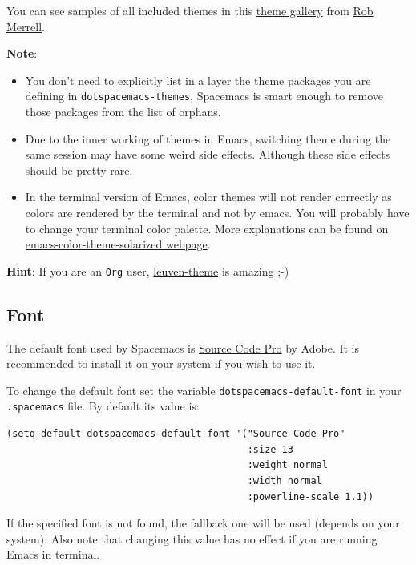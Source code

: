 \documentclass[11pt]{article}
\begin{document}
You can see samples of all included themes in this \href{http://themegallery.robdor.com}{theme gallery} from \href{http://www.twitter.com/robmerrell}{Rob Merrell}.

\textbf{Note}:
\begin{itemize}
\item You don't need to explicitly list in a layer the theme packages you are
defining in \texttt{dotspacemacs-themes}, Spacemacs is smart enough to remove those
packages from the list of orphans.
\item Due to the inner working of themes in Emacs, switching theme during the same
session may have some weird side effects. Although these side effects should
be pretty rare.
\item In the terminal version of Emacs, color themes will not render correctly as
colors are rendered by the terminal and not by emacs. You will probably have
to change your terminal color palette. More explanations can be found on
\href{https://github.com/sellout/emacs-color-theme-solarized\#important-note-for-terminal-users}{emacs-color-theme-solarized webpage}.
\end{itemize}

\textbf{Hint}: If you are an \texttt{Org} user, \href{https://github.com/fniessen/emacs-leuven-theme}{leuven-theme} is amazing ;-)

\subsection{Font}
\label{sec:org392fef9}
The default font used by Spacemacs is \href{https://github.com/adobe-fonts/source-code-pro}{Source Code Pro} by Adobe. It is
recommended to install it on your system if you wish to use it.

To change the default font set the variable \texttt{dotspacemacs-default-font} in your
\texttt{.spacemacs} file. By default its value is:

\begin{verbatim}
(setq-default dotspacemacs-default-font '("Source Code Pro"
                                          :size 13
                                          :weight normal
                                          :width normal
                                          :powerline-scale 1.1))
\end{verbatim}

If the specified font is not found, the fallback one will be used (depends on
your system). Also note that changing this value has no effect if you are
running Emacs in terminal.
\end{document}
